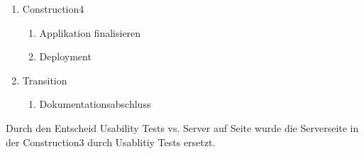 \begin{enumerate}
\begin{enumerate}
  \end{enumerate}
      \item Construction4
  \begin{enumerate}
    \item Applikation finalisieren
    \item Deployment
  \end{enumerate}
  \item Transition
  \begin{enumerate}
    \item Dokumentationsabschluss
  \end{enumerate}
\end{enumerate}

Durch den Entscheid Usability Tests vs. Server auf Seite \pageref{UsabilityEntscheid} wurde die Serverseite in der Construction3 durch Usablitiy Tests ersetzt.
\newpage






